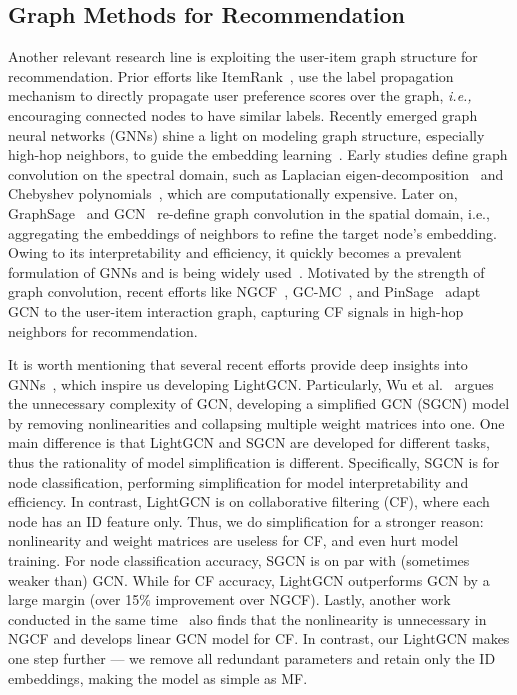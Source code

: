 \documentclass[sigconf]{acmart}
\newcommand{\ie}{\emph{i.e., }}
\theoremstyle{definition}
\begin{document}
\subsection{Graph Methods for Recommendation}
Another relevant research line is exploiting the user-item graph structure for recommendation.
Prior efforts like ItemRank~\cite{ItemRank}, use the label propagation mechanism to directly propagate user preference scores over the graph, \ie encouraging connected nodes to have similar labels.
Recently emerged graph neural networks (GNNs) shine a light on modeling graph structure, especially high-hop neighbors, to guide the embedding learning~\cite{GCN,GraphSAGE}.
Early studies define graph convolution on the spectral domain, such as Laplacian eigen-decomposition~\cite{DBLP:journals/corr/BrunaZSL13} and Chebyshev polynomials~\cite{FirstGCN}, which are computationally expensive.
Later on, GraphSage~\cite{GraphSAGE} and GCN~\cite{GCN} re-define graph convolution in the spatial domain, i.e., aggregating the embeddings of neighbors to refine the target node's embedding. Owing to its interpretability and efficiency, it quickly becomes a prevalent formulation of GNNs and is being widely used~\cite{DeepInf,Feng2019TOIS,zhao2019cross}.
Motivated by the strength of graph convolution, recent efforts like NGCF~\cite{NGCF}, GC-MC~\cite{GC-MC}, and PinSage~\cite{PinSage} adapt GCN to the user-item interaction graph, capturing CF signals in high-hop neighbors for recommendation.


It is worth mentioning that several recent efforts provide deep insights into GNNs~\cite{DeepInsights,ICLR19-APPNP,SGCN}, which inspire us developing LightGCN. Particularly, Wu et al.~\cite{SGCN} argues the unnecessary complexity of GCN, developing a simplified GCN (SGCN) model by removing nonlinearities and collapsing multiple weight matrices into one. 
One main difference is that LightGCN and SGCN are developed for different tasks, thus the rationality of model simplification is different. Specifically, SGCN is for node classification, performing simplification for model interpretability and efficiency. In contrast, LightGCN is on collaborative filtering (CF), where each node has an ID feature only. Thus, we do simplification for a stronger reason: nonlinearity and weight matrices are useless for CF, and even hurt model training. For node classification accuracy, SGCN is on par with (sometimes weaker than) GCN. While for CF accuracy, LightGCN outperforms GCN by a large margin (over 15\% improvement over NGCF). 
Lastly, another work conducted in the same time~\cite{LR-GCCF} also finds that the nonlinearity is unnecessary in NGCF and develops linear GCN model for CF. In contrast, our LightGCN makes one step further --- we remove all redundant parameters and retain only the ID embeddings, making the model as simple as MF. 
\end{document}

